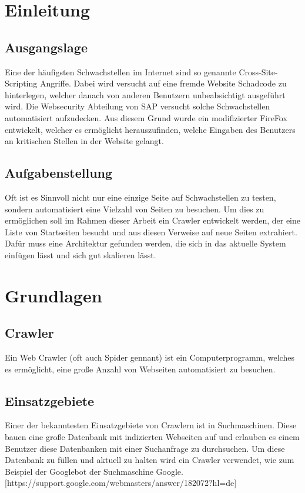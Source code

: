 \chapter{Einleitung}
\section{Ausgangslage}
Eine der häufigsten Schwachstellen im Internet sind so genannte Cross-Site-Scripting Angriffe. Dabei wird versucht auf eine fremde Website Schadcode zu hinterlegen, welcher danach von anderen Benutzern unbeabsichtigt ausgeführt wird. 
Die Websecurity Abteilung von SAP versucht solche Schwachstellen automatisiert aufzudecken. Aus diesem Grund wurde ein modifizierter FireFox entwickelt, welcher es ermöglicht herauszufinden, welche Eingaben des Benutzers an kritischen Stellen in der Website gelangt.
\section{Aufgabenstellung}
Oft ist es Sinnvoll nicht nur eine einzige Seite auf Schwachstellen zu testen, sondern automatisiert eine Vielzahl von Seiten zu besuchen. Um dies zu ermöglichen soll im Rahmen dieser Arbeit ein Crawler entwickelt werden, der eine Liste von Startseiten besucht und aus diesen Verweise auf neue Seiten extrahiert. 
Dafür muss eine Architektur gefunden werden, die sich in das aktuelle System einfügen lässt und sich gut skalieren lässt.

\chapter{Grundlagen}
\section{Crawler}
Ein Web Crawler (oft auch Spider gennant) ist ein Computerprogramm, welches es ermöglicht, eine große Anzahl von Webseiten automatisiert zu besuchen.
\section{Einsatzgebiete}
Einer der bekanntesten Einsatzgebiete von Crawlern ist in Suchmaschinen. Diese bauen eine große Datenbank mit indizierten Webseiten auf und erlauben es einem Benutzer diese Datenbanken mit einer Suchanfrage zu durchsuchen. Um diese Datenbank zu füllen und aktuell zu halten wird ein Crawler verwendet, wie zum Beispiel der Googlebot der Suchmaschine Google. [https://support.google.com/webmasters/answer/182072?hl=de]

